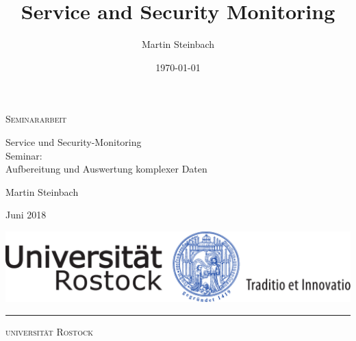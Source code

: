 \documentclass[a4paper,10pt]{scrreprt}
\title{Service and Security Monitoring}
\author{Martin Steinbach}
\date{\today}
\begin{document}



\thispagestyle{empty}

\begin{center}
  
  {\Large \textsc{Seminararbeit}
  
  \vspace{4.25cm}
  
  {\fontsize{22}{22}\selectfont Service und Security-Monitoring\\}
  \vspace{0.75cm}
  {\fontsize{20}{20}\selectfont Seminar:\\\vspace{0.2cm} Aufbereitung und Auswertung 
  komplexer Daten}
}
  
  \vspace{7.25cm}
  
  {\Large Martin Steinbach
    
    \vspace{.15cm}
    
    Juni 2018}
  
  \vspace{1.5cm}
  
  
  \includegraphics[scale=0.5]{img/siegel}
  
  \vspace{0.5cm}
  
  \rule{.7\textwidth}{.40pt}
  
  \vspace{.5cm}
  
  {\large\textsc{universität Rostock}}
    
    \vspace{.15cm}
        
\end{center}
\newpage 
\thispagestyle{empty}
\quad  \addtocounter{page}{-2}
\newpage
 
\end{document}
